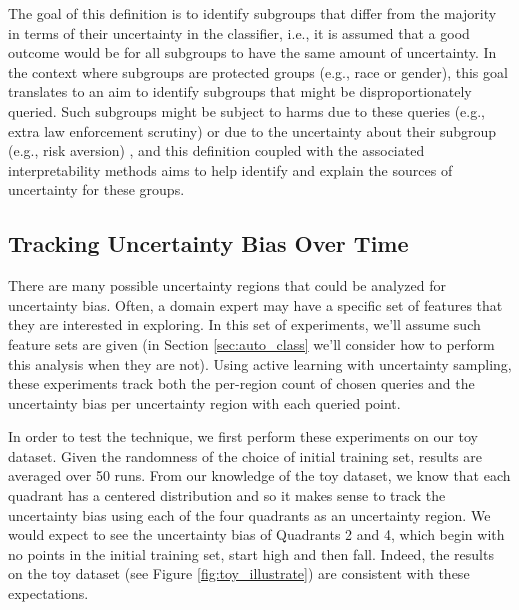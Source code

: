 The goal of this definition is to identify subgroups that differ from the majority in terms of their uncertainty in the classifier, i.e., it is assumed that a good outcome would be for all subgroups to have the same amount of uncertainty.  In the context where subgroups are protected groups (e.g., race or gender), this goal translates to an aim to identify subgroups that might be  disproportionately queried.  Such subgroups might be subject to harms due to these queries (e.g., extra law enforcement scrutiny) or due to the uncertainty about their subgroup (e.g., risk aversion) \cite{EUexplanationright}, and this definition coupled with the associated interpretability methods aims to help identify and explain the sources of uncertainty for these groups.

\subsection{Tracking Uncertainty Bias Over Time}

There are many possible uncertainty regions that could be analyzed for uncertainty bias.  Often, a domain expert may have a specific set of features that they are interested in exploring.  In this set of experiments, we'll assume such feature sets are given (in Section \ref{sec:auto_class} we'll consider how to perform this analysis when they are not).  Using active learning with uncertainty sampling, these experiments track both the per-region count of chosen queries and the uncertainty bias per uncertainty region with each queried point.

In order to test the technique, we first perform these experiments on our toy dataset. Given the randomness of the choice of initial training set, results are averaged over 50 runs. From our knowledge of the toy dataset, we know that each quadrant has a centered distribution and so it makes sense to track the uncertainty bias using each of the four quadrants as an uncertainty region. We would expect to see the uncertainty bias of Quadrants 2 and 4, which begin with no points in the initial training set, start high and then fall. Indeed, the results on the toy dataset (see Figure \ref{fig:toy_illustrate}) are consistent with these expectations. 

